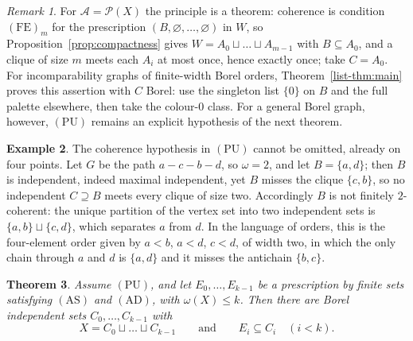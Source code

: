 \documentclass[11pt,reqno]{amsart}
\theoremstyle{plain}
\newtheorem{theorem}{Theorem}[section]
\theoremstyle{definition}
\newtheorem{example}[theorem]{Example}
\theoremstyle{remark}
\newtheorem{remark}[theorem]{Remark}
\newcommand{\cl}{\omega}
\begin{document}
\begin{remark}
\label{rem:PU-status}
For $\mathcal A=\mathcal P(X)$ the principle is a theorem: coherence is
condition $\mathrm{(FE)}_m$ for the prescription
$(B,\varnothing,\dots,\varnothing)$ in $W$, so
Proposition~\ref{prop:compactness} gives $W=A_0\sqcup\dots\sqcup A_{m-1}$ with
$B\subseteq A_0$, and a clique of size $m$ meets each $A_i$ at most once,
hence exactly once; take $C=A_0$. For incomparability graphs of finite-width Borel orders,
Theorem~\ref{list-thm:main} proves this assertion with $C$ Borel: use
the singleton list $\{0\}$ on $B$ and the full palette elsewhere,
then take the colour-$0$ class. For a general Borel graph, however,
$\mathrm{(PU)}$ remains an explicit hypothesis of the next theorem.
\end{remark}

\begin{example}
\label{ex:coherence-needed}
The coherence hypothesis in $\mathrm{(PU)}$ cannot be omitted, already on four
points. Let $G$ be the path $a-c-b-d$, so $\cl=2$, and let $B=\{a,d\}$; then
$B$ is independent, indeed maximal independent, yet $B$ misses the clique
$\{c,b\}$, so no independent $C\supseteq B$ meets every clique of size two.
Accordingly $B$ is not finitely $2$-coherent: the unique partition of the
vertex set into two independent sets is $\{a,b\}\sqcup\{c,d\}$, which separates
$a$ from $d$. In the language of orders, this is the four-element order given
by $a<b$, $a<d$, $c<d$, of width two, in which the only chain through $a$ and
$d$ is $\{a,d\}$ and it misses the antichain $\{b,c\}$.
\end{example}

\begin{theorem}
\label{thm:many}
Assume $\mathrm{(PU)}$, and let $E_0,\dots,E_{k-1}$ be a prescription by
finite sets satisfying $\mathrm{(AS)}$ and $\mathrm{(AD)}$, with
$\cl(X)\le k$. Then there are Borel independent sets $C_0,\dots,C_{k-1}$ with
\[
X=C_0\sqcup\dots\sqcup C_{k-1}
\qquad\text{and}\qquad
E_i\subseteq C_i\quad(i<k).
\]
\end{theorem}
\end{document}
